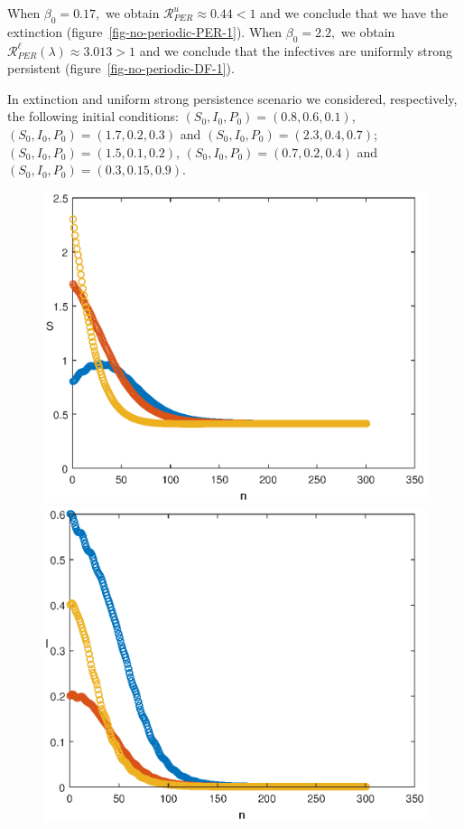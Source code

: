\documentclass[reqno]{amsart}
\begin{document}
{{When $\beta_0=0.17,$ we obtain $\mathcal R_{PER}^u\approx 0.44<1$ and we conclude that we have the extinction (figure~\ref{fig-no-periodic-PER-1}). When $\beta_0=2.2,$ we obtain $\mathcal R_{PER}^\ell(\lambda)\approx 3.013>1$ and we conclude that the infectives are uniformly strong persistent (figure~\ref{fig-no-periodic-DF-1}).

In extinction and uniform strong persistence scenario we considered, respectively, the following initial conditions: $(S_0,I_0,P_0)=(0.8,0.6,0.1)$, $(S_0,I_0,P_0)=(1.7,0.2,0.3)$ and $(S_0,I_0,P_0)=(2.3,0.4,0.7)$; $(S_0,I_0,P_0)=(1.5,0.1,0.2)$, $(S_0,I_0,P_0)=(0.7,0.2,0.4)$ and $(S_0,I_0,P_0)=(0.3,0.15,0.9)$.
\begin{figure}
  \begin{minipage}[b]{.32\linewidth}
    \includegraphics[width=\linewidth]{Susceptible_EXT_PER.eps}
  \end{minipage}
  \begin{minipage}[b]{.32\linewidth}
        \includegraphics[width=\linewidth]{Infected_EXT_PER.eps}

\end{minipage}
\end{figure}}}
\end{document}
